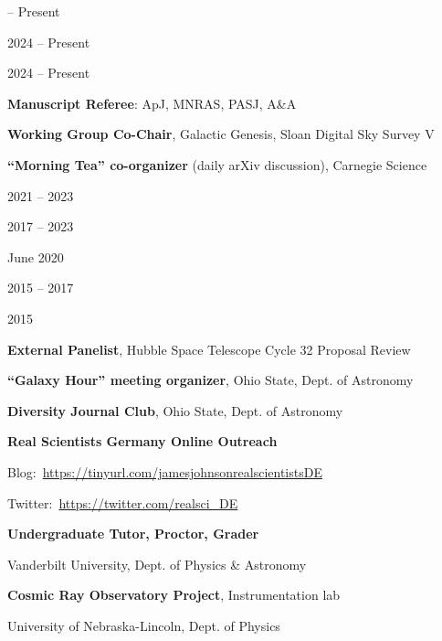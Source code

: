 \documentclass[cv.tex]{subfiles}
\begin{document}
\parbox{0.18\textwidth}{%
	 -- Present \par
	2024 -- Present \par
	2024 -- Present \par
}
\hspace{1mm}
\parbox{0.8\textwidth}{%
	\vspace{1mm}
	\textbf{Manuscript Referee}: ApJ, MNRAS, PASJ, A\&A \par
	\textbf{Working Group Co-Chair}, Galactic Genesis, Sloan Digital Sky Survey V
	\par
	\textbf{``Morning Tea'' co-organizer} (daily arXiv discussion), Carnegie
	Science \par
}

\newpage
\noindent
\parbox{0.18\textwidth}{%
	 \par
	2021 -- 2023 \par
	2017 -- 2023 \par
	June 2020 \par
	\null \par
	\null \par
	2015 -- 2017 \par
	\null \par
	2015 \par
	\null \par
}
\hspace{1mm}
\parbox{0.8\textwidth}{%
	\textbf{External Panelist}, Hubble Space Telescope Cycle 32 Proposal Review
	\par
	\textbf{``Galaxy Hour'' meeting organizer}, Ohio State, Dept. of Astronomy
	\par
	\textbf{Diversity Journal Club}, Ohio State, Dept. of Astronomy \par
	\textbf{Real Scientists Germany Online Outreach} \par
	Blog:~\url{https://tinyurl.com/jamesjohnsonrealscientistsDE} \par
	Twitter:~\url{https://twitter.com/realsci_DE} \par
	\textbf{Undergraduate Tutor, Proctor, Grader} \par
	Vanderbilt University, Dept. of Physics \& Astronomy \par
	\textbf{Cosmic Ray Observatory Project}, Instrumentation lab \par
	University of Nebraska-Lincoln, Dept. of Physics \par
}
\end{document}
